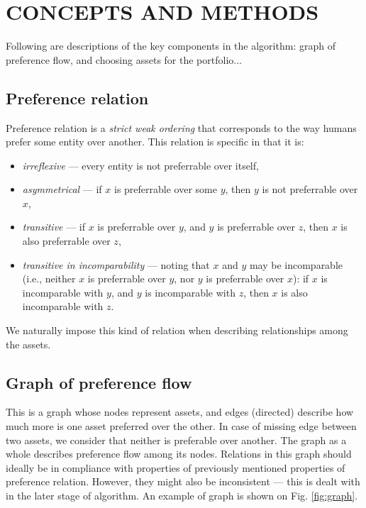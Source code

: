 \documentclass[letterpaper, 10 pt, conference]{ieeeconf}
\begin{document}
  \section{CONCEPTS AND METHODS}
  
  Following are descriptions of the key components in the algorithm: graph of preference flow, and choosing assets for the portfolio...
  
  \subsection{Preference relation}
  
  Preference relation is a \textit{strict weak ordering} that corresponds to the way humans prefer some entity over another.
  This relation is specific in that it is:
  \begin{itemize}
    \item \textit{irreflexive} --- every entity is not preferrable over itself,
    \item \textit{asymmetrical} --- if $x$ is preferrable over some $y$, then $y$ is not preferrable over $x$,
    \item \textit{transitive} --- if $x$ is preferrable over $y$, and $y$ is preferrable over $z$, then $x$ is also preferrable over $z$,
    \item \textit{transitive in incomparability} --- noting that $x$ and $y$ may be incomparable (i.e., neither $x$ is preferrable over $y$, nor $y$ is preferrable over $x$): if $x$ is incomparable with $y$, and $y$ is incomparable with $z$, then $x$ is also incomparable with $z$.
  \end{itemize}

  We naturally impose this kind of relation when describing relationships among the assets.
  
  \subsection{Graph of preference flow}
  
  This is a graph whose nodes represent assets, and edges (directed) describe how much more is one asset preferred over the other.
  In case of missing edge between two assets, we consider that neither is preferable over another.
  The graph as a whole describes preference flow among its nodes.
  Relations in this graph should ideally be in compliance with properties of previously mentioned properties of preference relation.
  However, they might also be inconsistent --- this is dealt with in the later stage of algorithm.
  An example of graph is shown on Fig. \ref{fig:graph}.
  
\end{document}
